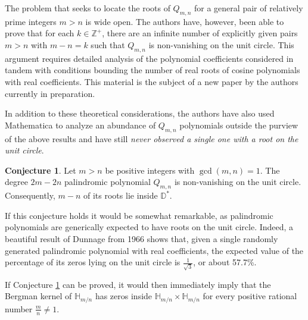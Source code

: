 \documentclass[letterpaper,11pt,reqno]{amsart}
\theoremstyle{plain}
\theoremstyle{definition}
\newtheorem{conjecture}[equation]{Conjecture}
\theoremstyle{remark}
\theoremstyle{remark}
\numberwithin{equation}{section}
\newcommand{\D}{{\mathbb D}}
\newcommand{\h}{{\mathbb H}}
\newcommand{\Z}{{\mathbb Z}}
\begin{document}
The problem that seeks to locate the roots of $Q_{m,n}$ for a general pair of relatively prime integers $m > n$ is wide open.
The authors have, however, been able to prove that for each $k \in \Z^+$, there are an infinite number of explicitly given pairs $m > n$ with $m-n=k$ such that $Q_{m,n}$ is non-vanishing on the unit circle.
This argument requires detailed analysis of the polynomial coefficients considered in tandem with conditions bounding the number of real roots of cosine polynomials with real coefficients.
This material is the subject of a new paper by the authors currently in preparation.

In addition to these theoretical considerations, the authors have also used Mathematica to analyze an abundance of $Q_{m,n}$ polynomials outside the purview of the above results and have still {\em never observed a single one with a root on the unit circle}.

\begin{conjecture}\label{Conj:non-vanishing}
Let $m > n$ be positive integers with $\gcd(m,n)=1$.
The degree $2m-2n$ palindromic polynomial $Q_{m,n}$ is non-vanishing on the unit circle.
Consequently, $m-n$ of its roots lie inside $\D^*$.
\end{conjecture}

If this conjecture holds it would be somewhat remarkable, as palindromic polynomials are generically expected to have roots on the unit circle.
Indeed, a beautiful result of Dunnage \cite{Dunn1966} from 1966 shows that, given a single randomly generated palindromic polynomial with real coefficients, the expected value of the percentage of its zeros lying on the unit circle is $\frac{1}{\sqrt{3}}$, or about 57.7\%.

If Conjecture \ref{Conj:non-vanishing} can be proved, it would then immediately imply that the Bergman kernel of $\h_{m/n}$ has zeros inside $\h_{m/n} \times \h_{m/n}$ for every positive rational number $\frac{m}{n} \neq 1$.


\end{document}
